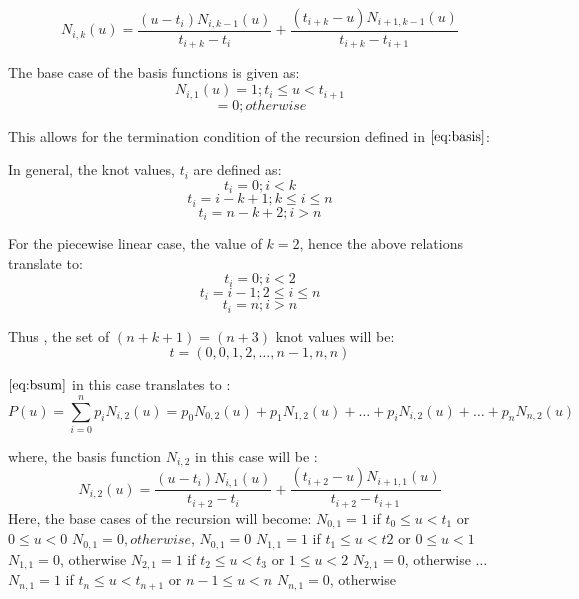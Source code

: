 \documentclass{article}
\begin{document}
\begin{equation}
   N_{i,k}(u) = \dfrac{(u - t_i) N_{i,k-1}(u)}{t_{i+k} - t_i} + \dfrac{(t_{i+k} - u)N_{i+1,k-1}(u)}{t_{i+k} - t_{i+1}}
  \label{eq:basis}
\end{equation}

The base case of the basis functions is given as:
\[ N_{i,1}(u) = 1; t_i \leq u < t_{i+1}\]
\[ = 0 ; otherwise\]

This allows for the termination condition of the recursion defined in $\eqref{eq:basis}$: \newline

In general, the knot values, $t_i$ are defined as: \newline
\[ t_i = 0; i < k\]
\[ t_i = i-k+1; k \leq i \leq n\]
\[ t_i = n-k+2; i > n\]

For the piecewise linear case, the value of $k=2$, hence the above relations translate to: 
\[ t_i = 0; i < 2\]
\[ t_i = i-1; 2 \leq i \leq n\]
\[ t_i = n; i > n\]

Thus , the set of $(n+k+1) = (n+3)$ knot values will be: \newline
\[ t = (0,0,1,2, \dots, n-1, n,n)\]

$\eqref{eq:bsum}$ in this case translates to : \newline
\[ P(u) = \sum_{i=0}^n p_i N_{i,2}(u) = p_0 N_{0,2}(u) + p_1 N_{1,2}(u) + \dots + p_i N_{i,2}(u) + \dots + p_n N_{n,2}(u) \]

where, the basis function $N_{i,2}$ in this case will be : \newline
\begin{equation}
   N_{i,2}(u) = \dfrac{(u - t_i) N_{i,1}(u)}{t_{i+2} - t_i} + \dfrac{(t_{i+2} - u)N_{i+1,1}(u)}{t_{i+2} - t_{i+1}}
   \label{eq:linbasis}
\end{equation}
Here, the base cases of the recursion will become: \newline
$N_{0,1} = 1 $ if $t_0 \leq u < t_1 $ or $0 \leq u < 0$ \newline
$N_{0,1} = 0, otherwise$, \newline
$N_{0,1} = 0$ \newline \newline
$N_{1,1} = 1$ if $t_1 \leq u < t2$ or $0 \leq u < 1$ \newline
$N_{1,1} = 0$, otherwise \newline \newline
$N_{2,1} = 1$ if $t_2 \leq u < t_3$ or $1 \leq u < 2$ \newline
$N_{2,1} = 0$, otherwise \newline \newline
$\dots$ \newline
$N_{n,1} = 1$ if $t_n \leq u < t_{n+1}$ or $n-1 \leq u < n$  \newline
$N_{n,1} = 0$, otherwise \newline \newline
\end{document}
